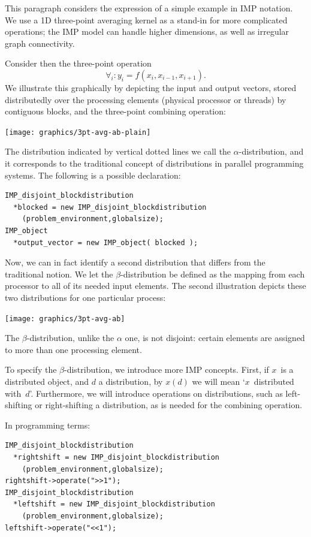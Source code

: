 This paragraph considers the expression of a simple example in
\ac{IMP} notation.  We use a 1D three-point averaging kernel as a
stand-in for more complicated operations; the \ac{IMP} model can
handle higher dimensions, as well as irregular graph connectivity.

Consider then the three-point operation
\begin{equation}
  \forall_i\colon y_i=f(x_i,x_{i-1},x_{i+1}).
  \label{eq:3ptscalar}
\end{equation}
We illustrate this graphically by depicting the input and output
vectors, stored distributedly over the processing elements (physical
processor or threads) by contiguous blocks, and the three-point
combining operation:

\texttt{[image: graphics/3pt-avg-ab-plain]}

The distribution indicated by vertical dotted lines
we call the $\alpha$-distribution, and it corresponds to 
the traditional concept of distributions in parallel programming systems.
The following is a possible declaration:
\begin{verbatim}
IMP_disjoint_blockdistribution
  *blocked = new IMP_disjoint_blockdistribution
    (problem_environment,globalsize);
IMP_object
  *output_vector = new IMP_object( blocked );
\end{verbatim}

Now, we can in fact identify a second distribution that differs from
the traditional notion. We let the $\beta$-distribution be defined as
the mapping from each processor to all of its needed input elements.
The second illustration depicts these two distributions
for one particular process:

\texttt{[image: graphics/3pt-avg-ab]}

The $\beta$-distribution, unlike the $\alpha$ one, is not disjoint:
certain elements are assigned to more than one processing element.

To specify the $\beta$-distribution, we introduce more IMP concepts.
First, if $x$~is a distributed object, and $d$ a distribution,
by $x(d)$ we will mean `$x$~distributed with~$d$'. Furthermore, we
will introduce operations on distributions, 
such as left-shifting or right-shifting a distribution,
as is needed for the combining operation.

In programming terms:
\begin{verbatim}
IMP_disjoint_blockdistribution
  *rightshift = new IMP_disjoint_blockdistribution
    (problem_environment,globalsize);
rightshift->operate(">>1"); 
IMP_disjoint_blockdistribution
  *leftshift = new IMP_disjoint_blockdistribution
    (problem_environment,globalsize);
leftshift->operate("<<1");
\end{verbatim}

